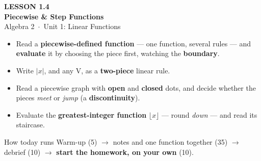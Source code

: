 \documentclass[aspectratio=169, 11pt]{beamer}
\begin{document}
{
\begin{frame}[plain]
  \vspace{2.8cm}\hspace{0.55cm}%
  \begin{minipage}{0.9\textwidth}
    {\color{goldacc}\bfseries\small LESSON 1.4}\\[0.5cm]
    {\color{white}\bfseries\LARGE Piecewise \& Step Functions}\\[1.2cm]
    {\color{forestmid}\small Algebra 2~$\cdot$~Unit 1: Linear Functions}
  \end{minipage}
\end{frame}
}

\begin{frame}[t, plain]
  \begin{itemize}\setlength{\itemsep}{6pt}
    \item Read a \textbf{piecewise-defined function} --- one function, several rules --- and
          \textbf{evaluate} it by choosing the piece first, watching the \textbf{boundary}.
    \item Write $|x|$, and any V, as a \textbf{two-piece} linear rule.
    \item Read a piecewise graph with \textbf{open} and \textbf{closed} dots, and decide whether
          the pieces \emph{meet} or \emph{jump} (a \textbf{discontinuity}).
    \item Evaluate the \textbf{greatest-integer function} $\lfloor x\rfloor$ --- round
          \emph{down} --- and read its staircase.
  \end{itemize}
  \vspace{4pt}
  \begin{block}{How today runs}
    Warm-up (5) $\to$ notes and one function together (35) $\to$ debrief (10) $\to$
    \textbf{start the homework, on your own} (10).
  \end{block}
\end{frame}
\end{document}
